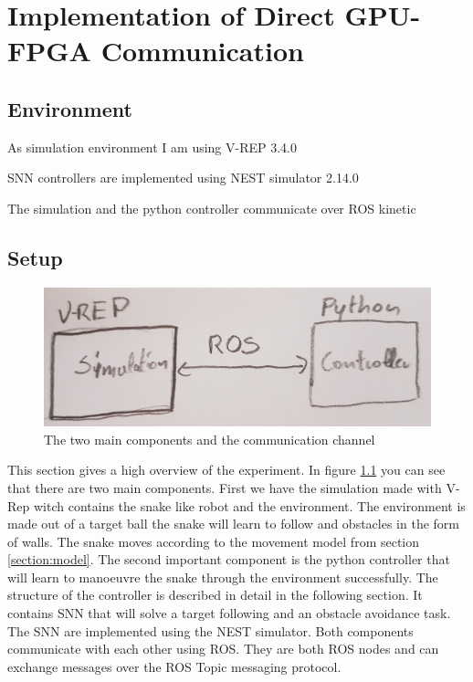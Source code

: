 \chapter{Implementation of Direct GPU-FPGA Communication}
\label{section:implementation}

\section{Environment}

As simulation environment I am using V-REP 3.4.0\cite{Rohmer2013}

SNN controllers are implemented using NEST simulator 2.14.0\cite{Peyser2017}

The simulation and the python controller communicate over ROS kinetic\cite{}


\section{Setup}

\begin{figure}
	\includegraphics[width=\linewidth]{images/setup.jpg}
	\caption{The two main components and the communication channel}
	\label{fig:setup}
\end{figure}


This section gives a high overview of the experiment. In figure \ref{fig:setup} you can see that there are two main components. First we have the simulation made with V-Rep witch contains the snake like robot and the environment. The environment is made out of a target ball the snake will learn to follow and obstacles in the form of walls. The snake moves according to the movement model from section \ref{section:model}. The second important component is the python controller that will learn to manoeuvre the snake through the environment successfully. The structure of the controller is described in detail in the following section. It contains SNN that will solve a target following and an obstacle avoidance task. The SNN are implemented using the NEST simulator. Both components communicate with each other using ROS. They are both ROS nodes and can exchange messages over the ROS Topic messaging protocol.


